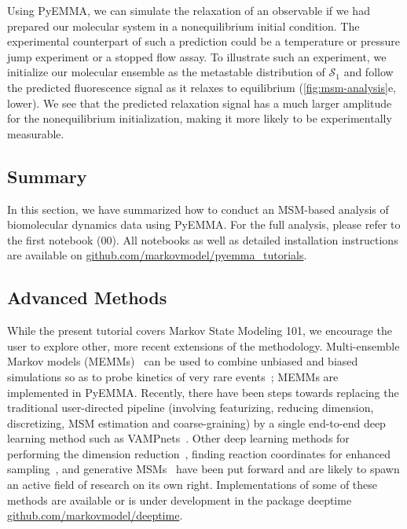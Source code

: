 \documentclass[9pt,tutorial]{livecoms}
\newcommand{\githubrepository}{\url{github.com/markovmodel/pyemma_tutorials}}
\begin{document}
Using PyEMMA, we can simulate the relaxation of an observable if we had prepared our molecular system in a nonequilibrium initial condition.
The experimental counterpart of such a prediction could be a temperature or pressure jump experiment or a stopped flow assay.
To illustrate such an experiment, we initialize our molecular ensemble as the metastable distribution of $\mathcal{S}_1$ and follow the predicted fluorescence signal as it relaxes to equilibrium (\ref{fig:msm-analysis}e, lower).
We see that the predicted relaxation signal has a much larger amplitude for the nonequilibrium initialization, making it more likely to be experimentally measurable.

\subsection{Summary}

In this section, we have summarized how to conduct an MSM-based analysis of biomolecular dynamics data using PyEMMA. For the full analysis, please refer to the first notebook (00). All notebooks as well as detailed installation instructions are available on \githubrepository{}.

\subsection{Advanced Methods}

While the present tutorial covers Markov State Modeling 101, we encourage the user to explore other, more recent extensions of the methodology. Multi-ensemble Markov models (MEMMs)~\cite{dtram,tram} can be used to combine unbiased and biased simulations so as to probe kinetics of very rare events~\cite{trammbar}; MEMMs are implemented in PyEMMA. Recently, there have been steps towards replacing the traditional user-directed pipeline (involving featurizing, reducing dimension, discretizing, MSM estimation and coarse-graining) by a single end-to-end deep learning method such as VAMPnets~\cite{vampnet}. Other deep learning methods for performing the dimension reduction~\cite{tae}, finding reaction coordinates for enhanced sampling~\cite{hernandez-vde,Sultan2018-vde-enhanced-sampling,Ribeiro2018-rave}, and generative MSMs~\cite{deep-gen-msm-preprint} have been put forward and are likely to spawn an active field of research on its own right. Implementations of some of these methods are available or is under development in the package deeptime \url{github.com/markovmodel/deeptime}. 
\end{document}
